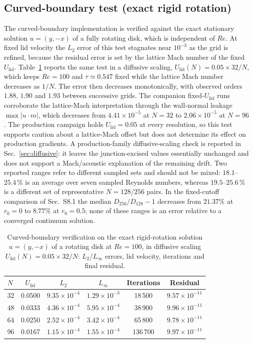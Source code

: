 \documentclass[11pt]{article}
\begin{document}
\subsection{Curved-boundary test (exact rigid rotation)}
The curved-boundary implementation is verified against the exact stationary
solution $u=(y,-x)$ of a fully rotating disk, which is independent of $Re$.
At fixed lid velocity the $L_2$ error of this test stagnates near $10^{-3}$ as
the grid is refined, because the residual error is set by the lattice Mach
number of the fixed $U_{\mathrm{lid}}$. Table~\ref{tab:rotation} reports the same
test in a diffusive scaling, $U_{\mathrm{lid}}(N)=0.05\times32/N$, which keeps
$Re=100$ and $\tau\simeq0.547$ fixed while the lattice Mach number decreases as
$1/N$. The error then decreases monotonically, with observed orders $1.88$,
$1.90$ and $1.93$ between successive grids. The companion
fixed-$U_{\mathrm{lid}}$ runs corroborate the lattice-Mach interpretation
through the wall-normal leakage $\max|u\cdot m|$, which decreases from
$4.41\times10^{-5}$ at $N=32$ to $2.06\times10^{-5}$ at $N=96$. The production
campaign holds $U_{\mathrm{lid}}=0.05$ at every resolution, so this test
supports caution about a lattice-Mach offset but does not determine its effect
on production gradients. A production-family diffusive-scaling check is
reported in Sec.~\ref{sec:diffusive}: it leaves the junction-excised values
essentially unchanged and does not support a Mach/acoustic explanation of the
remaining drift. Two reported ranges refer to different sampled sets and should
not be mixed: $18.1$--$25.4\,\%$ is an average over seven sampled Reynolds
numbers, whereas $19.5$--$25.6\,\%$ is a different set of
representative $N=128$/$256$ pairs. In the
fixed-cutoff comparison of Sec.~S8.1 the median $D_{256}/D_{128}-1$ decreases from
$21.37\%$ at $r_0=0$ to $8.77\%$ at $r_0=0.5$; none of these ranges is an error
relative to a converged continuum solution.
\begin{table}[H]
\centering
\caption{Curved-boundary verification on the exact rigid-rotation solution
$u=(y,-x)$ of a rotating disk at $Re=100$, in diffusive scaling
$U_{\mathrm{lid}}(N)=0.05\times32/N$: $L_2$/$L_\infty$ errors, lid velocity,
iterations and final residual.}




\label{tab:rotation}
\begin{tabular}{@{}lccccc@{}}
\toprule
$N$ & $U_{\mathrm{lid}}$ & $L_2$ & $L_\infty$ & Iterations & Residual \\
\midrule
32 & 0.0500 & $9.35\times10^{-4}$ & $1.29\times10^{-3}$ & 18\,500 & $9.57\times10^{-11}$ \\
48 & 0.0333 & $4.36\times10^{-4}$ & $5.95\times10^{-4}$ & 38\,900 & $9.96\times10^{-11}$ \\
64 & 0.0250 & $2.52\times10^{-4}$ & $3.42\times10^{-4}$ & 65\,800 & $9.78\times10^{-11}$ \\
96 & 0.0167 & $1.15\times10^{-4}$ & $1.55\times10^{-4}$ & 136\,700 & $9.97\times10^{-11}$ \\
\bottomrule
\end{tabular}
\end{table}
\end{document}
